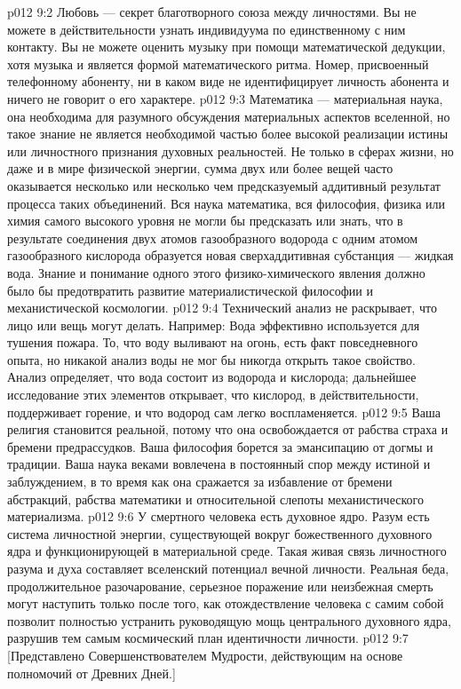\vs p012 9:2 \pc Любовь --- секрет благотворного союза между личностями. Вы не можете в действительности узнать индивидуума по единственному с ним контакту. Вы не можете оценить музыку при помощи математической дедукции, хотя музыка и является формой математического ритма. Номер, присвоенный телефонному абоненту, ни в каком виде не идентифицирует личность абонента и ничего не говорит о его характере.
\vs p012 9:3 Математика --- материальная наука, она необходима для разумного обсуждения материальных аспектов вселенной, но такое знание не является необходимой частью более высокой реализации истины или личностного признания духовных реальностей. Не только в сферах жизни, но даже и в мире физической энергии, сумма двух или более вещей часто оказывается несколько  или несколько  чем предсказуемый аддитивный результат процесса таких объединений. Вся наука математика, вся философия, физика или химия самого высокого уровня не могли бы предсказать или знать, что в результате соединения двух атомов газообразного водорода с одним атомом газообразного кислорода образуется новая сверхаддитивная субстанция --- жидкая вода. Знание и понимание одного этого физико\hyp{}химического явления должно было бы предотвратить развитие материалистической философии и механистической космологии.
\vs p012 9:4 Технический анализ не раскрывает, что лицо или вещь могут делать. Например: Вода эффективно используется для тушения пожара. То, что воду выливают на огонь, есть факт повседневного опыта, но никакой анализ воды не мог бы никогда открыть такое свойство. Анализ определяет, что вода состоит из водорода и кислорода; дальнейшее исследование этих элементов открывает, что кислород, в действительности, поддерживает горение, и что водород сам легко воспламеняется.
\vs p012 9:5 Ваша религия становится реальной, потому что она освобождается от рабства страха и бремени предрассудков. Ваша философия борется за эмансипацию от догмы и традиции. Ваша наука веками вовлечена в постоянный спор между истиной и заблуждением, в то время как она сражается за избавление от бремени абстракций, рабства математики и относительной слепоты механистического материализма.
\vs p012 9:6 \pc У смертного человека есть духовное ядро. Разум есть система личностной энергии, существующей вокруг божественного духовного ядра и функционирующей в материальной среде. Такая живая связь личностного разума и духа составляет вселенский потенциал вечной личности. Реальная беда, продолжительное разочарование, серьезное поражение или неизбежная смерть могут наступить только после того, как отождествление человека с самим собой позволит полностью устранить руководящую мощь центрального духовного ядра, разрушив тем самым космический план идентичности личности.
\vsetoff
\vs p012 9:7 [Представлено Совершенствователем Мудрости, действующим на основе полномочий от Древних Дней.]
